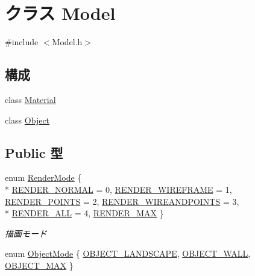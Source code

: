 \hypertarget{class_model}{\section{クラス Model}
\label{class_model}
}


{\ttfamily \#include $<$Model.\-h$>$}

\subsection*{構成}
\begin{DoxyCompactItemize}
\item 
class \hyperlink{class_model_1_1_material}{Material}
\item 
class \hyperlink{class_model_1_1_object}{Object}
\end{DoxyCompactItemize}
\subsection*{Public 型}
\begin{DoxyCompactItemize}
\item 
enum \hyperlink{class_model_a517f749b2393c98904f33fe5134098f6}{Render\-Mode} \{ \\*
\hyperlink{class_model_a517f749b2393c98904f33fe5134098f6a89507b2dbde648e7a53107cde745fa44}{R\-E\-N\-D\-E\-R\-\_\-\-N\-O\-R\-M\-A\-L} = 0, 
\hyperlink{class_model_a517f749b2393c98904f33fe5134098f6ace626117567530dfea8c320219730d4f}{R\-E\-N\-D\-E\-R\-\_\-\-W\-I\-R\-E\-F\-R\-A\-M\-E} = 1, 
\hyperlink{class_model_a517f749b2393c98904f33fe5134098f6aca0b7050073ccf10531637b657f25019}{R\-E\-N\-D\-E\-R\-\_\-\-P\-O\-I\-N\-T\-S} = 2, 
\hyperlink{class_model_a517f749b2393c98904f33fe5134098f6a5dc9ddc701c8a06a4d42bd1961b5368b}{R\-E\-N\-D\-E\-R\-\_\-\-W\-I\-R\-E\-A\-N\-D\-P\-O\-I\-N\-T\-S} = 3, 
\\*
\hyperlink{class_model_a517f749b2393c98904f33fe5134098f6a1ad15a2114c73c545eddb828ac0f7d75}{R\-E\-N\-D\-E\-R\-\_\-\-A\-L\-L} = 4, 
\hyperlink{class_model_a517f749b2393c98904f33fe5134098f6a50c0c96623577e4e8b94a515171e40d7}{R\-E\-N\-D\-E\-R\-\_\-\-M\-A\-X}
 \}
\begin{DoxyCompactList}\small\item\em 描画モード \end{DoxyCompactList}\item 
enum \hyperlink{class_model_a4f992cedea9b4d32ad881d192895e858}{Object\-Mode} \{ \hyperlink{class_model_a4f992cedea9b4d32ad881d192895e858a8dda4c02384f5cf85b9eb108af2d1b69}{O\-B\-J\-E\-C\-T\-\_\-\-L\-A\-N\-D\-S\-C\-A\-P\-E}, 
\hyperlink{class_model_a4f992cedea9b4d32ad881d192895e858a521fc7067f1bd84c10065c4ee9e3a914}{O\-B\-J\-E\-C\-T\-\_\-\-W\-A\-L\-L}, 
\hyperlink{class_model_a4f992cedea9b4d32ad881d192895e858ac99c81755e44275215a92a94ac6aeeda}{O\-B\-J\-E\-C\-T\-\_\-\-M\-A\-X}
 \}
\end{DoxyCompactItemize}
